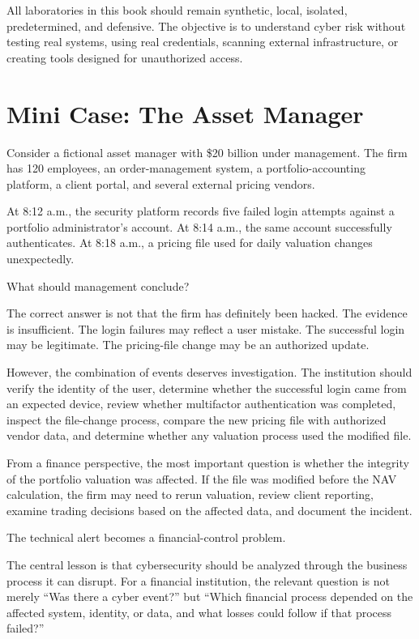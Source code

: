 \begin{safetyrule}
All laboratories in this book should remain synthetic, local, isolated, predetermined, and defensive. The objective is to understand cyber risk without testing real systems, using real credentials, scanning external infrastructure, or creating tools designed for unauthorized access.
\end{safetyrule}

\section{Mini Case: The Asset Manager}

Consider a fictional asset manager with \$20 billion under management. The firm has 120 employees, an order-management system, a portfolio-accounting platform, a client portal, and several external pricing vendors.

At 8:12 a.m., the security platform records five failed login attempts against a portfolio administrator's account. At 8:14 a.m., the same account successfully authenticates. At 8:18 a.m., a pricing file used for daily valuation changes unexpectedly.

What should management conclude?

The correct answer is not that the firm has definitely been hacked. The evidence is insufficient. The login failures may reflect a user mistake. The successful login may be legitimate. The pricing-file change may be an authorized update.

However, the combination of events deserves investigation. The institution should verify the identity of the user, determine whether the successful login came from an expected device, review whether multifactor authentication was completed, inspect the file-change process, compare the new pricing file with authorized vendor data, and determine whether any valuation process used the modified file.

From a finance perspective, the most important question is whether the integrity of the portfolio valuation was affected. If the file was modified before the NAV calculation, the firm may need to rerun valuation, review client reporting, examine trading decisions based on the affected data, and document the incident.

The technical alert becomes a financial-control problem.

\begin{risklens}
The central lesson is that cybersecurity should be analyzed through the business process it can disrupt. For a financial institution, the relevant question is not merely ``Was there a cyber event?'' but ``Which financial process depended on the affected system, identity, or data, and what losses could follow if that process failed?''
\end{risklens}

